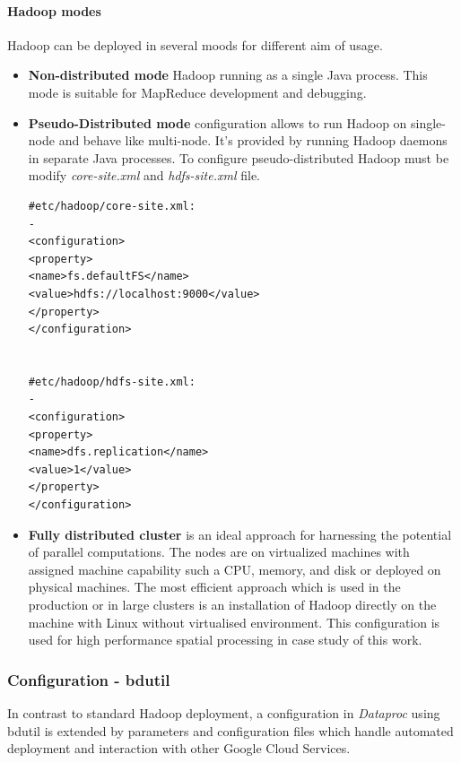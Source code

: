 \documentclass[a4paper,12pt,oneside]{report}
\begin{document}
	\paragraph{Hadoop modes} Hadoop can be deployed in several moods for different aim of usage. 
		\begin{itemize}
	    \item \textbf{Non-distributed mode} Hadoop running  as a single Java process. This mode  is suitable for MapReduce development and debugging.
	 	
		\item \textbf{Pseudo-Distributed mode}  configuration allows to run  Hadoop on
		single-node and behave
		like multi-node. It's provided by running Hadoop daemons in separate Java
		processes. To configure pseudo-distributed Hadoop must be modify
		\textit{core-site.xml} and \textit{hdfs-site.xml} file\cite{hadoop_modes}.  
		
		
		\begin{footnotesize}
			\begin{lstlisting}[style=python]
#etc/hadoop/core-site.xml:
-
<configuration>
<property>
<name>fs.defaultFS</name>
<value>hdfs://localhost:9000</value>
</property>
</configuration>


#etc/hadoop/hdfs-site.xml: 
-
<configuration>
<property>
<name>dfs.replication</name>
<value>1</value>
</property>
</configuration>
			\end{lstlisting}
		\end{footnotesize}
		
		\item \textbf{Fully distributed cluster} is an ideal approach for harnessing the
		potential of	parallel computations. The nodes are on virtualized machines with 
		assigned machine capability such a CPU, memory, and disk or deployed on physical machines. 
		The most efficient approach which is used in the production or in large clusters is an installation of Hadoop directly on the machine with Linux without virtualised environment. 
		This configuration is used for high performance spatial processing in case study of this work.
		
	\end{itemize}
	
	
	\subsubsection{Configuration - bdutil}
	In contrast to standard Hadoop deployment, a configuration in \textit{Dataproc}
	using bdutil is  extended by parameters and configuration files which handle automated deployment
	and interaction with other Google Cloud Services. 
\end{document}
